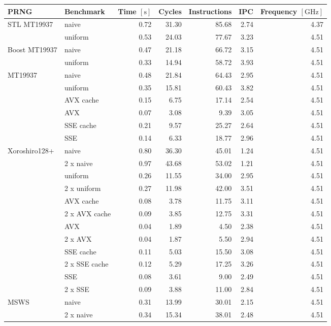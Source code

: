 \documentclass{stdlocal}
\begin{document}
\begin{tabular}{llrrrrr}
  \hline
  \textbf{PRNG} & \textbf{Benchmark} & \textbf{Time} $[\mathrm{s}]$ & \textbf{Cycles} & \textbf{Instructions} & \textbf{IPC} & \textbf{Frequency} $[\mathrm{GHz}]$ \\
  \hline
  \hline
  \multirow{2}{*}{STL MT19937}
  & naive &  0.72 &  31.30  & 85.68 &  2.74 & 4.37 \\
  & uniform & 0.53 & 24.03 & 77.67 & 3.23 & 4.51 \\
  \hline
  \multirow{2}{*}{Boost MT19937}
  & naive & 0.47 & 21.18 & 66.72 & 3.15 & 4.51 \\
  & uniform & 0.33 & 14.94 & 58.72 & 3.93 & 4.51 \\
  \hline
  \multirow{6}{*}{MT19937}
  & naive & 0.48 & 21.84 & 64.43 & 2.95 & 4.51 \\
  & uniform & 0.35 & 15.81 & 60.43 & 3.82 & 4.51 \\
  & AVX cache & 0.15 & 6.75 & 17.14 & 2.54 & 4.51 \\
  & AVX & 0.07 & 3.08 & 9.39 & 3.05 & 4.51 \\
  & SSE cache & 0.21 & 9.57 & 25.27 & 2.64 & 4.51 \\
  & SSE & 0.14 & 6.33 & 18.77 & 2.96 & 4.51 \\
  \hline
  \multirow{12}{*}{Xoroshiro128+}
  & naive & 0.80 & 36.30 & 45.01 & 1.24 & 4.51 \\
  & 2 x naive & 0.97 & 43.68 & 53.02 & 1.21 & 4.51 \\
  & uniform & 0.26 & 11.55 & 34.00 & 2.95 & 4.51 \\
  & 2 x uniform & 0.27 & 11.98 & 42.00 & 3.51 & 4.51 \\
  & AVX cache & 0.08 & 3.78 & 11.75 & 3.11 & 4.51 \\
  & 2 x AVX cache & 0.09 & 3.85 & 12.75 & 3.31 & 4.51 \\
  & AVX & 0.04 & 1.89 & 4.50 & 2.38 & 4.51 \\
  & 2 x AVX & 0.04 & 1.87 & 5.50 & 2.94 & 4.51 \\
  & SSE cache & 0.11 & 5.03 & 15.50 & 3.08 & 4.51 \\
  & 2 x SSE cache & 0.12 & 5.29 & 17.25 & 3.26 & 4.51 \\
  & SSE & 0.08 & 3.61 & 9.00 & 2.49 & 4.51 \\
  & 2 x SSE & 0.09 & 3.88 & 11.00 & 2.84 & 4.51 \\
  \hline
  \multirow{12}{*}{MSWS}
  & naive & 0.31 & 13.99 & 30.01 & 2.15 & 4.51 \\
  & 2 x naive & 0.34 & 15.34 & 38.01 & 2.48 & 4.51 \\

\end{tabular}
\end{document}
